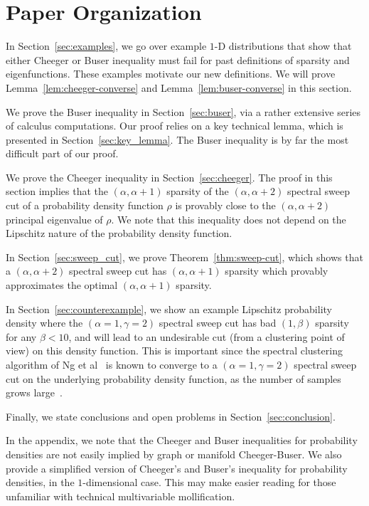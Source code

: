 \section{Paper Organization}

In Section~\ref{sec:examples}, we go over example $1$-D
distributions that show that either Cheeger or Buser inequality
must fail for past definitions of sparsity and eigenfunctions.
These examples motivate our new definitions.  We will prove Lemma~\ref{lem:cheeger-converse} and
Lemma~\ref{lem:buser-converse} in this section.  

We prove the Buser inequality in Section~\ref{sec:buser},
   via a rather extensive series of calculus computations.
Our proof relies on a key technical lemma, which is presented in
Section~\ref{sec:key_lemma}.  The Buser inequality is by far the most difficult part of
our proof. 

We prove the Cheeger inequality in Section~\ref{sec:cheeger}.
The proof in this section implies that the $(\alpha, \alpha+1)$
sparsity of the $(\alpha, \alpha+2)$ spectral sweep cut of a
probability density function $\rho$ is provably close to the
$(\alpha, \alpha+2)$ principal eigenvalue of $\rho$.  We note
that this inequality does not depend on the Lipschitz nature of
the probability density function.

In Section~\ref{sec:sweep_cut}, we prove
Theorem~\ref{thm:sweep-cut}, which shows that a $(\alpha,
    \alpha+2)$ spectral sweep cut has $(\alpha, \alpha+1)$
sparsity which provably approximates the optimal $(\alpha,
    \alpha+1)$ sparsity.


In Section~\ref{sec:counterexample}, we show an example Lipschitz
probability density where the $(\alpha = 1, \gamma=2)$ spectral sweep
cut has bad $(1,\beta)$ sparsity for any $\beta < 10$, and will
lead to an undesirable cut (from a clustering point of view) on this density function.
This is important since the spectral clustering
algorithm of Ng et al~\cite{NgSpectral01} is known to converge
to a $(\alpha=1, \gamma=2)$ spectral sweep cut on the underlying
probability density function, as the number of
samples grows large~\cite{TrillosVariational15}. 

Finally, we state conclusions and open problems in Section~\ref{sec:conclusion}.

In the appendix, we note that the Cheeger and Buser inequalities for probability
densities are not easily implied by graph or manifold
Cheeger-Buser. We also provide a simplified version of Cheeger's and
Buser's inequality for probability densities, in the $1$-dimensional case. This
may make easier reading for those unfamiliar with technical
multivariable mollification.
